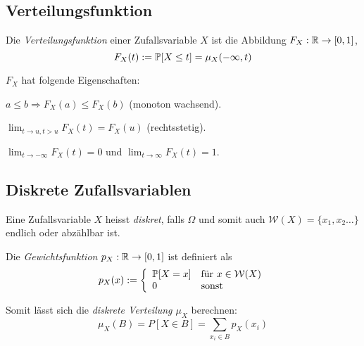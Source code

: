 \subsection{Verteilungsfunktion}
\begin{definition}[Verteilungsfunktion]
	Die \emph{Verteilungsfunktion} einer Zufallsvariable \(X\) ist die Abbildung \(F_X:\R \rightarrow[0,1]\),
	\[
		F_X(t) := \P[X \leq t] = \mu_X(-\infty,t)
	\]

	\begin{note}
		\(F_X\) hat folgende Eigenschaften:
		\begin{compactenum}[i:]
			\item \(a \leq b \Rightarrow F_X(a) \leq F_X(b)\) (monoton wachsend).
			\item \(\displaystyle\lim_{t\rightarrow u, t > u}F_X(t) = F_X(u)\) (rechtsstetig).
			\item \(\displaystyle\lim_{t\rightarrow-\infty} F_X(t) = 0\) und \(\displaystyle\lim_{t\rightarrow\infty} F_X(t) = 1\).
		\end{compactenum}
	\end{note}

\end{definition}



\subsection{Diskrete Zufallsvariablen}

Eine Zufallsvariable \(X\) heisst \emph{diskret}, falls \(\Omega\) und somit auch \(\mathcal{W}(X) = \{x_1,x_2\ldots\}\) endlich oder abzählbar ist.

\begin{definition}[Gewichtsfunktion]
	Die \emph{Gewichtsfunktion} \(p_X:\R \rightarrow [0,1]\) ist definiert als
	\[
		p_X(x) :=
		\left\{\begin{array}{ll}
			\P[X = x] & \text{für }x \in \mathcal{W}(X) \\
			0         & \text{sonst}
		\end{array}\right.
	\]

	Somit lässt sich die \emph{diskrete Verteilung \(\mu_X\)} berechnen:
	\[	\mu_X(B) = P[X \in B] = \sum_{x_i \in B} p_X(x_i) \]

\end{definition}


